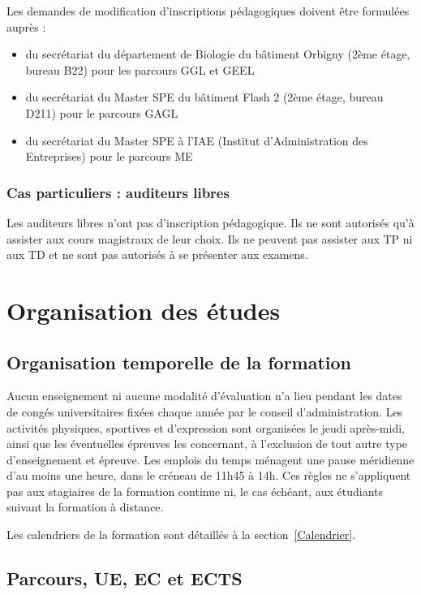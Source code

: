 \documentclass[a4paper,11pt]{article}
\begin{document}
Les demandes de modification d'inscriptions pédagogiques doivent être formulées auprès :
\begin{itemize}
\item du secrétariat du département de Biologie du bâtiment Orbigny (2ème étage, bureau B22) pour les parcours GGL et GEEL
\item du secrétariat du Master SPE du bâtiment Flash 2 (2ème étage, bureau D211) pour le parcours GAGL
\item du secrétariat du Master SPE à l'IAE (Institut d'Administration des Entreprises) pour le parcours ME
\end{itemize}

\subsubsection{Cas particuliers : auditeurs libres}
Les auditeurs libres n'ont pas d'inscription pédagogique. Ils ne sont autorisés qu'à assister aux cours magistraux de leur choix. Ils ne peuvent pas assister aux TP ni aux TD et ne sont pas autorisés à se présenter aux examens.

\section{Organisation des études}\label{Organisation}

\subsection{Organisation temporelle de la formation}\label{Temporel}

Aucun enseignement ni aucune modalité d'évaluation n'a lieu pendant les dates de congés universitaires fixées chaque année par le conseil d'administration. Les activités physiques, sportives et d'expression sont organisées le jeudi après-midi, ainsi que les éventuelles épreuves les concernant, à l'exclusion de tout autre type d'enseignement et épreuve. Les emplois du temps ménagent une pause méridienne d'au moins une heure, dans le créneau de 11h45 à 14h. Ces règles ne s'appliquent pas aux stagiaires de la formation continue ni, le cas échéant, aux étudiants suivant la formation à distance.

Les calendriers de la formation sont détaillés à la section~\ref{Calendrier}.

\subsection{Parcours, UE, EC et ECTS}
\end{document}

